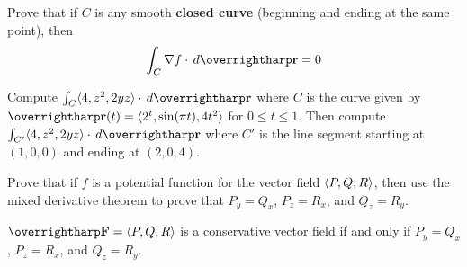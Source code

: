 \documentclass[letterpaper, twoside, 12pt]{book}
\begin{document}
          \begin{problem}
            Prove that if $C$ is any smooth \textbf{closed curve}
            (beginning and ending at the same point), then
            \[
              \int_C \nabla f\cdot \dvar{\vect{r}} = 0
            \]
          \end{problem}

          \begin{solution}

          \end{solution}

          \begin{contributors}

          \end{contributors}

          \begin{problem}
            Compute $\int_C\<4,z^2,2yz\>\cdot\dvar{\vect r}$ where
            $C$ is the curve given by
            $\vect{r}(t)=\<2^t,\sin (\pi t),4t^2\>$ for $0\leq t\leq 1$.
            Then compute $\int_{C'}\<4,z^2,2yz\>\cdot\dvar{\vect r}$ where
            $C'$ is the line segment starting at $(1,0,0)$ and ending
            at $(2,0,4)$.
          \end{problem}

          \begin{solution}

          \end{solution}

          \begin{contributors}

          \end{contributors}

          \begin{problem}
            Prove that if $f$ is a potential function for the vector field
            $\langle P,Q,R\rangle$, then use the mixed derivative theorem to prove that
            $P_y=Q_x$, $P_z=R_x$, and $Q_z=R_y$.
          \end{problem}

          \begin{solution}

          \end{solution}

          \begin{contributors}

          \end{contributors}

\begin{theorem}
  $\vect{F}=\<P,Q,R\>$ is a conservative vector field if and only if
  $P_y=Q_x$, $P_z=R_x$, and $Q_z=R_y$.
\end{theorem}
\end{document}
